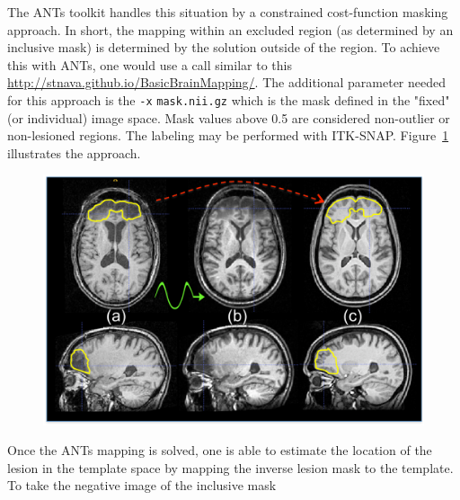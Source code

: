 \documentclass{InsightArticle}
\begin{document}
The ANTs toolkit handles this situation by a constrained cost-function
masking approach. In short, the mapping within an excluded region (as
determined by an inclusive mask) is determined by the solution outside
of the region. To achieve this with ANTs, one would use a call similar
to this \href{http://stnava.github.io/BasicBrainMapping/}{http://stnava.github.io/BasicBrainMapping/}.
The additional parameter needed for this approach 
is the \texttt{-x}  \texttt{mask.nii.gz}  which 
is the mask defined in the "fixed" (or individual) image space.  
Mask values above 0.5 are considered non-outlier or non-lesioned regions.
The labeling may be performed with ITK-SNAP. 
Figure~\ref{fig:lesion} illustrates the approach.
\begin{figure}
\includegraphics[width=1\textwidth]{Figures/lesionstudy.pdf}
\label{fig:lesion}
\end{figure}
Once the ANTs mapping is solved, 
one is able to estimate the location of the lesion in the template space by mapping the inverse lesion mask to the template.
To take the negative image of the inclusive mask 
\end{document}
